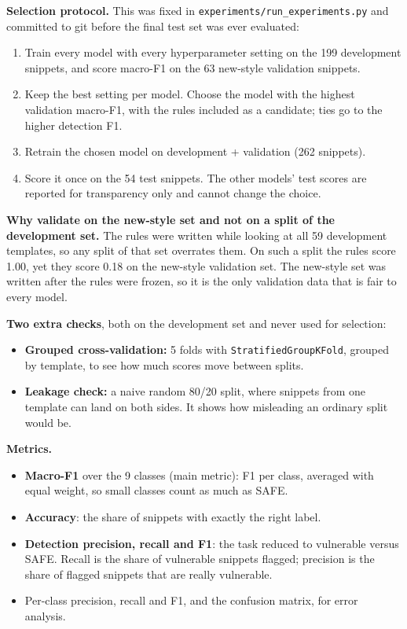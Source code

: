 \documentclass[11pt,a4paper]{article}
\newcommand{\code}[1]{\texttt{#1}}
\begin{document}
\textbf{Selection protocol.} This was fixed in \code{experiments/run\_experiments.py} and
committed to git before the final test set was ever evaluated:
\begin{enumerate}
  \item Train every model with every hyperparameter setting on the 199 development
        snippets, and score macro-F1 on the 63 new-style validation snippets.
  \item Keep the best setting per model. Choose the model with the highest validation
        macro-F1, with the rules included as a candidate; ties go to the higher detection
        F1.
  \item Retrain the chosen model on development + validation (262 snippets).
  \item Score it once on the 54 test snippets. The other models' test scores are reported
        for transparency only and cannot change the choice.
\end{enumerate}

\textbf{Why validate on the new-style set and not on a split of the development set.}
The rules were written while looking at all 59 development templates, so any split of
that set overrates them. On such a split the rules score 1.00, yet they score 0.18 on the
new-style validation set. The new-style set was written after the rules were frozen, so it
is the only validation data that is fair to every model.

\textbf{Two extra checks}, both on the development set and never used for selection:
\begin{itemize}
  \item \textbf{Grouped cross-validation:} 5 folds with \code{StratifiedGroupKFold},
        grouped by template, to see how much scores move between splits.
  \item \textbf{Leakage check:} a naive random 80/20 split, where snippets from one
        template can land on both sides. It shows how misleading an ordinary split would
        be.
\end{itemize}

\textbf{Metrics.}
\begin{itemize}
  \item \textbf{Macro-F1} over the 9 classes (main metric): F1 per class, averaged with
        equal weight, so small classes count as much as SAFE.
  \item \textbf{Accuracy}: the share of snippets with exactly the right label.
  \item \textbf{Detection precision, recall and F1}: the task reduced to vulnerable versus
        SAFE. Recall is the share of vulnerable snippets flagged; precision is the share
        of flagged snippets that are really vulnerable.
  \item Per-class precision, recall and F1, and the confusion matrix, for error analysis.
\end{itemize}
\end{document}
